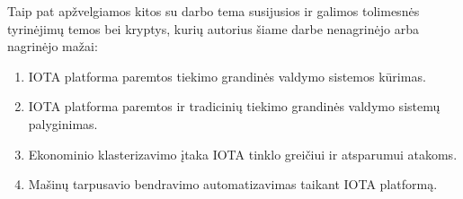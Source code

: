 Taip pat apžvelgiamos kitos su darbo tema susijusios ir galimos tolimesnės tyrinėjimų temos bei kryptys, kurių autorius šiame darbe nenagrinėjo arba nagrinėjo mažai:
\begin{enumerate}
    \item IOTA platforma paremtos tiekimo grandinės valdymo sistemos kūrimas.
    \item IOTA platforma paremtos ir tradicinių tiekimo grandinės valdymo sistemų palyginimas.
    \item Ekonominio klasterizavimo įtaka IOTA tinklo greičiui ir atsparumui atakoms.
    \item Mašinų tarpusavio bendravimo automatizavimas taikant IOTA platformą.
\end{enumerate} 